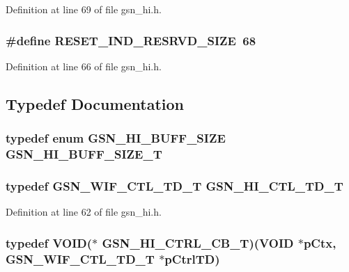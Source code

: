 Definition at line 69 of file gsn\_\-hi.h.

\hypertarget{a00504_ab962077fafe0d5c7cf939b161ee036cd}{
\subsubsection[{RESET\_\-IND\_\-RESRVD\_\-SIZE}]{\setlength{\rightskip}{0pt plus 5cm}\#define RESET\_\-IND\_\-RESRVD\_\-SIZE~68}}
\label{a00504_ab962077fafe0d5c7cf939b161ee036cd}


Definition at line 66 of file gsn\_\-hi.h.



\subsection{Typedef Documentation}
\hypertarget{a00504_a12fd1388defb0650e3a3e453d080a348}{
\subsubsection[{GSN\_\-HI\_\-BUFF\_\-SIZE\_\-T}]{\setlength{\rightskip}{0pt plus 5cm}typedef enum {\bf GSN\_\-HI\_\-BUFF\_\-SIZE} {\bf GSN\_\-HI\_\-BUFF\_\-SIZE\_\-T}}}
\label{a00504_a12fd1388defb0650e3a3e453d080a348}
\hypertarget{a00504_a5e4c16c7fbbdd09aba0c540321f7096c}{
\subsubsection[{GSN\_\-HI\_\-CTL\_\-TD\_\-T}]{\setlength{\rightskip}{0pt plus 5cm}typedef {\bf GSN\_\-WIF\_\-CTL\_\-TD\_\-T} {\bf GSN\_\-HI\_\-CTL\_\-TD\_\-T}}}
\label{a00504_a5e4c16c7fbbdd09aba0c540321f7096c}


Definition at line 62 of file gsn\_\-hi.h.

\hypertarget{a00504_a9943ae3de497f108841d00f0b80ff390}{
\subsubsection[{GSN\_\-HI\_\-CTRL\_\-CB\_\-T}]{\setlength{\rightskip}{0pt plus 5cm}typedef VOID($\ast$ {\bf GSN\_\-HI\_\-CTRL\_\-CB\_\-T})(VOID $\ast$pCtx, {\bf GSN\_\-WIF\_\-CTL\_\-TD\_\-T} $\ast$pCtrlTD)}}
\label{a00504_a9943ae3de497f108841d00f0b80ff390}


